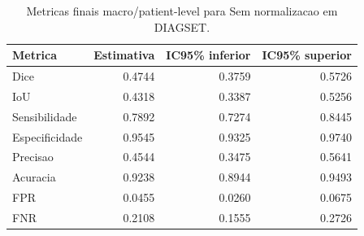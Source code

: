 \begin{table}[!htb]
\centering
\caption{Metricas finais macro/patient-level para Sem normalizacao em DIAGSET.}
\label{tab:results_diagset-macro-not_normalized}
\small
\begin{tabular}{lrrr}
\toprule
Metrica & Estimativa & IC95\% inferior & IC95\% superior \\
\midrule
Dice & 0.4744 & 0.3759 & 0.5726 \\
IoU & 0.4318 & 0.3387 & 0.5256 \\
Sensibilidade & 0.7892 & 0.7274 & 0.8445 \\
Especificidade & 0.9545 & 0.9325 & 0.9740 \\
Precisao & 0.4544 & 0.3475 & 0.5641 \\
Acuracia & 0.9238 & 0.8944 & 0.9493 \\
FPR & 0.0455 & 0.0260 & 0.0675 \\
FNR & 0.2108 & 0.1555 & 0.2726 \\
\bottomrule
\end{tabular}
\end{table}
